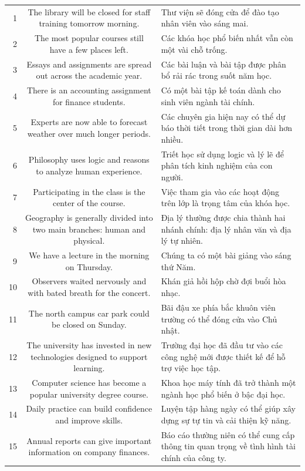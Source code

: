 \documentclass[11pt,a4paper]{article}
\begin{document}
\begin{longtable}{N S M}
1 & The library will be closed for staff training tomorrow morning. & Thư viện sẽ đóng cửa để đào tạo nhân viên vào sáng mai. \\
2 & The most popular courses still have a few places left. & Các khóa học phổ biến nhất vẫn còn một vài chỗ trống. \\
3 & Essays and assignments are spread out across the academic year. & Các bài luận và bài tập được phân bổ rải rác trong suốt năm học. \\
4 & There is an accounting assignment for finance students. & Có một bài tập kế toán dành cho sinh viên ngành tài chính. \\
5 & Experts are now able to forecast weather over much longer periods. & Các chuyên gia hiện nay có thể dự báo thời tiết trong thời gian dài hơn nhiều. \\
6 & Philosophy uses logic and reasons to analyze human experience. & Triết học sử dụng logic và lý lẽ để phân tích kinh nghiệm của con người. \\
7 & Participating in the class is the center of the course. & Việc tham gia vào các hoạt động trên lớp là trọng tâm của khóa học. \\
8 & Geography is generally divided into two main branches: human and physical. & Địa lý thường được chia thành hai nhánh chính: địa lý nhân văn và địa lý tự nhiên. \\
9 & We have a lecture in the morning on Thursday. & Chúng ta có một bài giảng vào sáng thứ Năm. \\
10 & Observers waited nervously and with bated breath for the concert. & Khán giả hồi hộp chờ đợi buổi hòa nhạc. \\
11 & The north campus car park could be closed on Sunday. & Bãi đậu xe phía bắc khuôn viên trường có thể đóng cửa vào Chủ nhật. \\
12 & The university has invested in new technologies designed to support learning. & Trường đại học đã đầu tư vào các công nghệ mới được thiết kế để hỗ trợ việc học tập. \\
13 & Computer science has become a popular university degree course. & Khoa học máy tính đã trở thành một ngành học phổ biến ở bậc đại học. \\
14 & Daily practice can build confidence and improve skills. & Luyện tập hàng ngày có thể giúp xây dựng sự tự tin và cải thiện kỹ năng. \\
15 & Annual reports can give important information on company finances. & Báo cáo thường niên có thể cung cấp thông tin quan trọng về tình hình tài chính của công ty. \\

\end{longtable}
\end{document}
